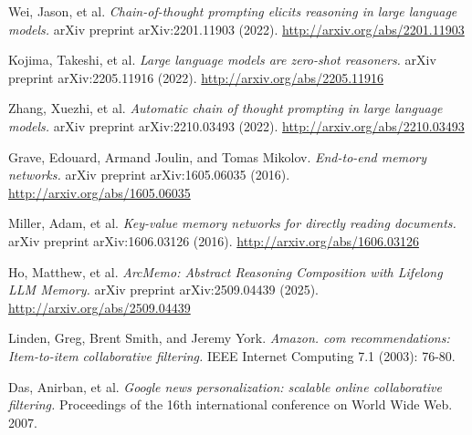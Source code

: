 \documentclass{article}
\begin{document}
\begin{thebibliography}{9}

 Wei, Jason, et al. \textit{Chain-of-thought prompting elicits reasoning in large language models.} arXiv preprint arXiv:2201.11903 (2022). \href{http://arxiv.org/abs/2201.11903}{http://arxiv.org/abs/2201.11903}

 Kojima, Takeshi, et al. \textit{Large language models are zero-shot reasoners.} arXiv preprint arXiv:2205.11916 (2022). \href{http://arxiv.org/abs/2205.11916}{http://arxiv.org/abs/2205.11916}

 Zhang, Xuezhi, et al. \textit{Automatic chain of thought prompting in large language models.} arXiv preprint arXiv:2210.03493 (2022). \href{http://arxiv.org/abs/2210.03493}{http://arxiv.org/abs/2210.03493}

 Grave, Edouard, Armand Joulin, and Tomas Mikolov. \textit{End-to-end memory networks.} arXiv preprint arXiv:1605.06035 (2016). \href{http://arxiv.org/abs/1605.06035}{http://arxiv.org/abs/1605.06035}

 Miller, Adam, et al. \textit{Key-value memory networks for directly reading documents.} arXiv preprint arXiv:1606.03126 (2016). \href{http://arxiv.org/abs/1606.03126}{http://arxiv.org/abs/1606.03126}

 Ho, Matthew, et al. \textit{ArcMemo: Abstract Reasoning Composition with Lifelong LLM Memory.} arXiv preprint arXiv:2509.04439 (2025). \href{http://arxiv.org/abs/2509.04439}{http://arxiv.org/abs/2509.04439}

 Linden, Greg, Brent Smith, and Jeremy York. \textit{Amazon. com recommendations: Item-to-item collaborative filtering.} IEEE Internet Computing 7.1 (2003): 76-80.

 Das, Anirban, et al. \textit{Google news personalization: scalable online collaborative filtering.} Proceedings of the 16th international conference on World Wide Web. 2007.

\end{thebibliography}
\end{document}
